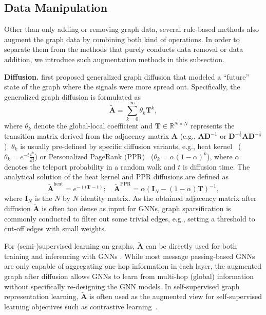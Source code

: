 \documentclass[11pt]{article}
\renewcommand\paragraph[1]{\vspace{0.05in} \noindent \textbf{#1.}}
\begin{document}
\subsection{Data Manipulation}
\label{sec:tong_datamani}
Other than only adding or removing graph data, several rule-based methods also augment the graph data by combining both kind of operations. In order to separate them from the methods that purely conducts data removal or data addition, we introduce such augmentation methods in this subsection.

\paragraph{Diffusion}
\citet{klicpera2019diffusion} first proposed generalized graph diffusion that modeled a ``future'' state of the graph where the signals were more spread out. Specifically, the generalized graph diffusion is formulated as
\begin{equation}
    \tilde{\mathbf{A}} = \sum_{k=0}^{\infty}\theta_k\mathbf{T}^k,
\end{equation}
where $\theta_k$ denote the global-local coefficient and $\mathbf{T} \in \mathbb{R}^{N\times N}$ represents the transition matrix derived from the adjacency matrix $\mathbf{A}$ (e.g., $\mathbf{A}\mathbf{D}^{-1}$ or $\mathbf{D}^{-\frac{1}{2}}\mathbf{A}\mathbf{D}^{-\frac{1}{2}}$). 
$\theta_k$ is usually pre-defined by specific diffusion variants, e.g., heat kernel~\cite{kondor2002diffusion} ($\theta_k=e^{-t}\frac{t^k}{k!}$) or Personalized PageRank (PPR)~\cite{page1999pagerank} ($\theta_k = \alpha(1-\alpha)^k$), where $\alpha$ denotes the teleport probability in a random walk and $t$ is diffusion time. The analytical solution of the heat kernel and PPR diffusions are defined as
\begin{equation}
    \tilde{\mathbf{A}}^{\text{heat}} = e^{-(t\mathbf{T} - t)}; \quad
    \tilde{\mathbf{A}}^{\text{PPR}} = \alpha (\mathbf{I}_N - (1-\alpha)\mathbf{T})^{-1},
\end{equation}
where $\mathbf{I}_N$ is the $N$ by $N$ identity matrix. As the obtained adjacency matrix after diffusion $\tilde{\mathbf{A}}$ is often too dense as input for GNNs, graph sparsification is commonly conducted to filter out some trivial edges, e.g., setting a threshold to cut-off edges with small weights.

For (semi-)supervised learning on graphs, $\tilde{\mathbf{A}}$ can be directly used for both training and inferencing with GNNs \cite{klicpera2019diffusion}. While most message passing-based GNNs are only capable of aggregating one-hop information in each layer, the augmented graph after diffusion allows GNNs to learn from multi-hop (global) information without specifically re-designing the GNN models. In self-supervised graph representation learning, $\tilde{\mathbf{A}}$ is often used as the augmented view for self-supervised learning objectives such as contrastive learning~\cite{hassani2020contrastive,yuan2021semi}.
\end{document}
